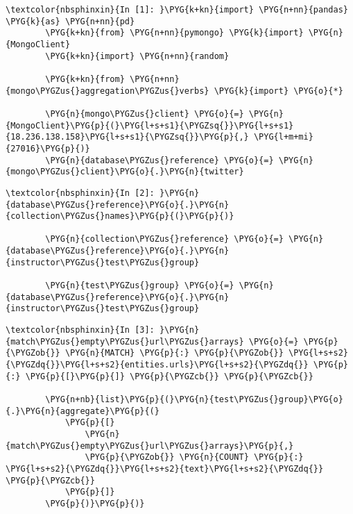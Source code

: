 \documentclass[letterpaper,10pt,english]{sphinxmanual}
\begin{document}
%
\begin{Verbatim}[commandchars=\\\{\}]
\textcolor{nbsphinxin}{In [1]: }\PYG{k+kn}{import} \PYG{n+nn}{pandas} \PYG{k}{as} \PYG{n+nn}{pd}
        \PYG{k+kn}{from} \PYG{n+nn}{pymongo} \PYG{k}{import} \PYG{n}{MongoClient}
        \PYG{k+kn}{import} \PYG{n+nn}{random}
        
        \PYG{k+kn}{from} \PYG{n+nn}{mongo\PYGZus{}aggregation\PYGZus{}verbs} \PYG{k}{import} \PYG{o}{*}
        
        \PYG{n}{mongo\PYGZus{}client} \PYG{o}{=} \PYG{n}{MongoClient}\PYG{p}{(}\PYG{l+s+s1}{\PYGZsq{}}\PYG{l+s+s1}{18.236.138.158}\PYG{l+s+s1}{\PYGZsq{}}\PYG{p}{,} \PYG{l+m+mi}{27016}\PYG{p}{)}
        \PYG{n}{database\PYGZus{}reference} \PYG{o}{=} \PYG{n}{mongo\PYGZus{}client}\PYG{o}{.}\PYG{n}{twitter}
\end{Verbatim}

%
\begin{Verbatim}[commandchars=\\\{\}]
\textcolor{nbsphinxin}{In [2]: }\PYG{n}{database\PYGZus{}reference}\PYG{o}{.}\PYG{n}{collection\PYGZus{}names}\PYG{p}{(}\PYG{p}{)}
        
        \PYG{n}{collection\PYGZus{}reference} \PYG{o}{=} \PYG{n}{database\PYGZus{}reference}\PYG{o}{.}\PYG{n}{instructor\PYGZus{}test\PYGZus{}group}
        
        \PYG{n}{test\PYGZus{}group} \PYG{o}{=} \PYG{n}{database\PYGZus{}reference}\PYG{o}{.}\PYG{n}{instructor\PYGZus{}test\PYGZus{}group}
\end{Verbatim}

%
\begin{Verbatim}[commandchars=\\\{\}]
\textcolor{nbsphinxin}{In [3]: }\PYG{n}{match\PYGZus{}empty\PYGZus{}url\PYGZus{}arrays} \PYG{o}{=} \PYG{p}{\PYGZob{}} \PYG{n}{MATCH} \PYG{p}{:} \PYG{p}{\PYGZob{}} \PYG{l+s+s2}{\PYGZdq{}}\PYG{l+s+s2}{entities.urls}\PYG{l+s+s2}{\PYGZdq{}} \PYG{p}{:} \PYG{p}{[}\PYG{p}{]} \PYG{p}{\PYGZcb{}} \PYG{p}{\PYGZcb{}}
        
        \PYG{n+nb}{list}\PYG{p}{(}\PYG{n}{test\PYGZus{}group}\PYG{o}{.}\PYG{n}{aggregate}\PYG{p}{(}
            \PYG{p}{[}
                \PYG{n}{match\PYGZus{}empty\PYGZus{}url\PYGZus{}arrays}\PYG{p}{,}
                \PYG{p}{\PYGZob{}} \PYG{n}{COUNT} \PYG{p}{:} \PYG{l+s+s2}{\PYGZdq{}}\PYG{l+s+s2}{text}\PYG{l+s+s2}{\PYGZdq{}} \PYG{p}{\PYGZcb{}}
            \PYG{p}{]}
        \PYG{p}{)}\PYG{p}{)}
\end{Verbatim}
\end{document}
